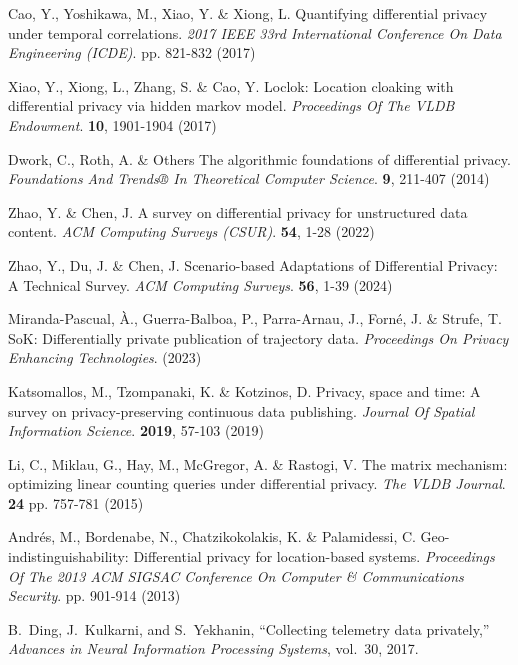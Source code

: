 \begin{thebibliography}{10}
\begin{small}
Cao, Y., Yoshikawa, M., Xiao, Y. \& Xiong, L. Quantifying differential privacy under temporal correlations. {\em 2017 IEEE 33rd International Conference On Data Engineering (ICDE)}. pp. 821-832 (2017)

Xiao, Y., Xiong, L., Zhang, S. \& Cao, Y. Loclok: Location cloaking with differential privacy via hidden markov model. {\em Proceedings Of The VLDB Endowment}. \textbf{10}, 1901-1904 (2017)

Dwork, C., Roth, A. \& Others The algorithmic foundations of differential privacy. {\em Foundations And Trends® In Theoretical Computer Science}. \textbf{9}, 211-407 (2014)

Zhao, Y. \& Chen, J. A survey on differential privacy for unstructured data content. {\em ACM Computing Surveys (CSUR)}. \textbf{54}, 1-28 (2022)

Zhao, Y., Du, J. \& Chen, J. Scenario-based Adaptations of Differential Privacy: A Technical Survey. {\em ACM Computing Surveys}. \textbf{56}, 1-39 (2024)

Miranda-Pascual, À., Guerra-Balboa, P., Parra-Arnau, J., Forné, J. \& Strufe, T. SoK: Differentially private publication of trajectory data. {\em Proceedings On Privacy Enhancing Technologies}. (2023)

Katsomallos, M., Tzompanaki, K. \& Kotzinos, D. Privacy, space and time: A survey on privacy-preserving continuous data publishing. {\em Journal Of Spatial Information Science}. \textbf{2019}, 57-103 (2019)

Li, C., Miklau, G., Hay, M., McGregor, A. \& Rastogi, V. The matrix mechanism: optimizing linear counting queries under differential privacy. {\em The VLDB Journal}. \textbf{24} pp. 757-781 (2015)

Andrés, M., Bordenabe, N., Chatzikokolakis, K. \& Palamidessi, C. Geo-indistinguishability: Differential privacy for location-based systems. {\em Proceedings Of The 2013 ACM SIGSAC Conference On Computer \& Communications Security}. pp. 901-914 (2013)


	
	
	
B.~Ding, J.~Kulkarni, and S.~Yekhanin, ``Collecting telemetry data privately,''
\emph{Advances in Neural Information Processing Systems}, vol.~30, 2017.


\end{small}
\end{thebibliography}
